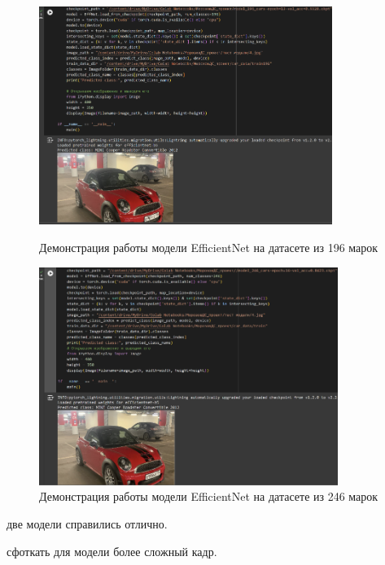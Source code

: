 \documentclass[14pt]{extarticle}
\begin{document}
\begin{figure}[H]
\centering
\begin{minipage}{0.49\textwidth}
  \centering
  \includegraphics[height=7.1cm]{images/18.png}  
  \caption{Демонстрация работы модели \foreignlanguage{english}{EfficientNet} на датасете из 196 марок}
  \label{fig:12}
\end{minipage}
\hfill
\begin{minipage}{0.49\textwidth}
  \centering
  \includegraphics[height=7.1cm]{images/19.png}  
  \caption{Демонстрация работы модели \foreignlanguage{english}{EfficientNet} на датасете из 246 марок}
  \label{fig:13}
\end{minipage}
\end{figure}

 две модели справились отлично.

 сфоткать для модели более сложный кадр.
\end{document}
